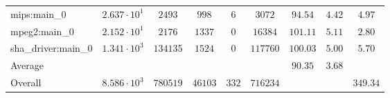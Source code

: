 \begin{tabular}{|l|c|c|c|c|c|c|c|c|}
mips:main\_0            & $ 2.637 \cdot 10^{1} $ & $ 2493   $ & $ 998   $ & $ 6   $ & $ 3072   $ & $ 94.54       $ & $ 4.42    $ & $ 4.97    $ \\
mpeg2:main\_0           & $ 2.152 \cdot 10^{1} $ & $ 2176   $ & $ 1337  $ & $ 0   $ & $ 16384  $ & $ 101.11      $ & $ 5.11    $ & $ 2.80    $ \\
sha\_driver:main\_0     & $ 1.341 \cdot 10^{3} $ & $ 134135 $ & $ 1524  $ & $ 0   $ & $ 117760 $ & $ 100.03      $ & $ 5.00    $ & $ 5.70    $ \\
\hline
Average                 & $                    $ & $        $ & $       $ & $     $ & $        $ & $ 90.35       $ & $ 3.68    $ & $         $ \\
\hline
Overall                 & $ 8.586 \cdot 10^{3} $ & $ 780519 $ & $ 46103 $ & $ 332 $ & $ 716234 $ & $             $ & $         $ & $ 349.34  $ \\
\hline
\end{tabular}
